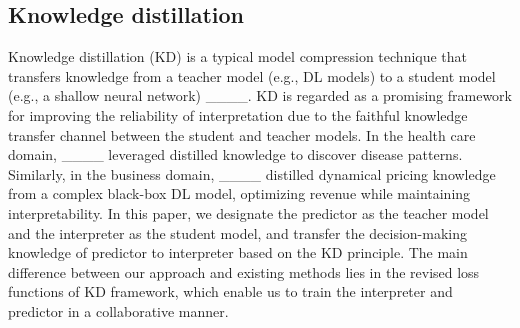 \subsection{Knowledge distillation}
Knowledge distillation (KD) is a typical model compression technique that transfers knowledge from a teacher model (e.g., DL models) to a student model (e.g., a shallow neural network) ____. KD is regarded as a promising framework for improving the reliability of interpretation due to the faithful knowledge transfer channel between the student and teacher models. In the health care domain, ____ leveraged distilled knowledge to discover disease patterns. Similarly, in the business domain, ____ distilled dynamical pricing knowledge from a complex black-box DL model, optimizing revenue while maintaining interpretability. In this paper, we designate the predictor as the teacher model and the interpreter as the student model, and transfer the decision-making knowledge of predictor to interpreter based on the KD principle. The main difference between our approach and existing methods lies in the revised loss functions of KD framework, which enable us to train the interpreter and predictor in a collaborative manner.


